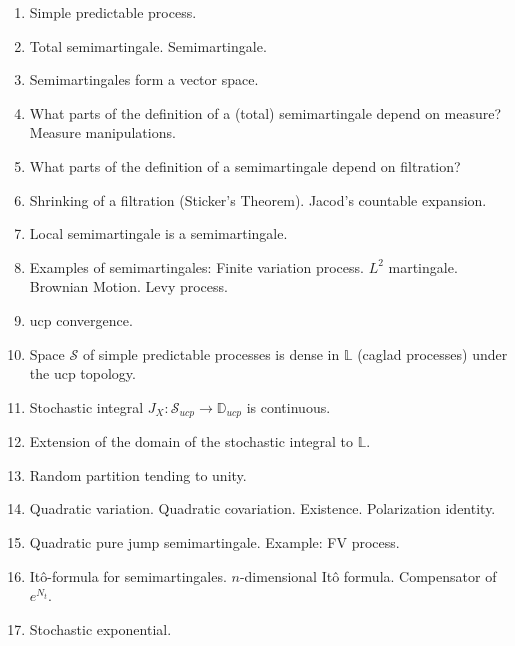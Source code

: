\documentclass[11pt,oneside]{amsart}
\begin{document}
\begin{enumerate}[resume]
    \item Simple predictable process.
    \item Total semimartingale. Semimartingale.
    \item Semimartingales form a vector space.
    \item What parts of the definition of a (total) semimartingale depend on measure? 
        Measure manipulations.
    \item What parts of the definition of a semimartingale depend on filtration? 
    \item Shrinking of a filtration (Sticker's Theorem). Jacod's countable expansion.
    \item Local semimartingale is a semimartingale.
    \item Examples of semimartingales: Finite variation process. $L^2$ martingale. Brownian Motion. Levy process.
    \item ucp convergence.
    \item Space $\mathcal S$ of simple predictable processes is dense in $\mathbb L$ (caglad processes) under the ucp topology.
    \item Stochastic integral $J_X: \mathcal{S}_{ucp} \to \mathbb{D}_{ucp}$ is continuous.
    \item Extension of the domain of the stochastic integral to $\mathbb L$.
    \item Random partition tending to unity.
    \item Quadratic variation. Quadratic covariation. Existence. Polarization identity.
    \item Quadratic pure jump semimartingale. Example: FV process.
    \item It\^o-formula for semimartingales. $n$-dimensional It\^o formula. Compensator of $e^{N_t}$.
    \item Stochastic exponential.
\end{enumerate}
\end{document}
